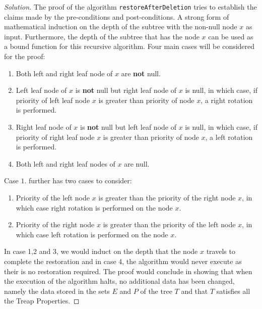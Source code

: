 \documentclass[12pt]{article}
\newenvironment{solution}{\renewcommand\qedsymbol{$\blacksquare$}\begin{proof}[Solution]}{\end{proof}}
\begin{document}
\begin{solution}
The proof of the algorithm \texttt{restoreAfterDeletion} tries to establish the claims made by the pre-conditions and post-conditions. A strong form of mathematical induction on the depth of the subtree with the non-null node $x$ as input. Furthermore, the depth of the subtree that has the node $x$ can be used as a bound function for this recursive algorithm. Four main cases will be considered for the proof:

\begin{enumerate}
    \item Both left and right leaf node of $x$ are \textbf{not} null.
    
    \item Left leaf node of $x$ is \textbf{not} null but right leaf node of $x$ is null, in which case, if priority of left leaf node $x$ is greater than priority of node $x$, a right rotation is performed.
    
    \item Right leaf node of $x$ is \textbf{not} null but left leaf node of $x$ is null, in which case, if priority of right leaf node $x$ is greater than priority of node $x$, a left rotation is performed.
    
    \item  Both left and right leaf nodes of $x$ are null.
\end{enumerate}

Case $1.$ further has two cases to consider:
\begin{enumerate}[label=(\alph*)]
    \item Priority of the left node $x$ is greater than the priority of the right node $x$, in which case right rotation is performed on the node $x$.
    
    \item Priority of the right node $x$ is greater than the priority of the left node $x$, in which case left rotation is performed on the node $x$.
\end{enumerate}
In case 1,2 and 3, we would induct on the depth that the node $x$ travels to complete the restoration and in case 4, the algorithm would never execute as their is no restoration required. The proof would conclude in showing that when the execution of the algorithm halts, no additional data has been changed, namely the data stored in the sets $E$ and $P$ of the tree $T$ and that $T$ satisfies all the Treap Properties.
\end{solution}
\end{document}
